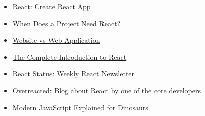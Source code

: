 \begin{itemize}[leftmargin=*]
    \item \href{https://reactjs.org/docs/add-react-to-a-new-app.html#create-react-app}{React: Create React App}
    \item \href{https://css-tricks.com/project-need-react/}{When Does a Project Need React?}
    \item \href{https://www.seguetech.com/website-vs-web-application-whats-the-difference/}{Website vs Web Application}
    \item \href{https://jscomplete.com/learn/complete-intro-react}{The Complete Introduction to React}
    \item \href{http://react.statuscode.com/}{React Status}: Weekly React Newsletter
    \item \href{https://overreacted.io}{Overreacted}: Blog about React by one of the core developers
    \item \href{https://medium.com/the-node-js-collection/modern-javascript-explained-for-dinosaurs-f695e9747b70}{Modern JavaScript Explained for Dinosaurs}
\end{itemize}

